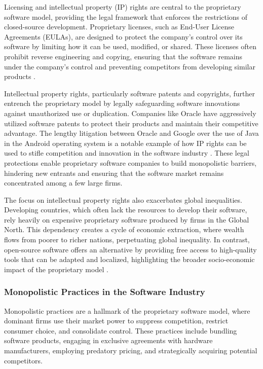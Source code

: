 \begin{refsection}
Licensing and intellectual property (IP) rights are central to the proprietary software model, providing the legal framework that enforces the restrictions of closed-source development. Proprietary licenses, such as End-User License Agreements (EULAs), are designed to protect the company’s control over its software by limiting how it can be used, modified, or shared. These licenses often prohibit reverse engineering and copying, ensuring that the software remains under the company’s control and preventing competitors from developing similar products \cite[pp.~85-90]{stallman2010}.

Intellectual property rights, particularly software patents and copyrights, further entrench the proprietary model by legally safeguarding software innovations against unauthorized use or duplication. Companies like Oracle have aggressively utilized software patents to protect their products and maintain their competitive advantage. The lengthy litigation between Oracle and Google over the use of Java in the Android operating system is a notable example of how IP rights can be used to stifle competition and innovation in the software industry \cite[pp.~58-65]{perens2005}. These legal protections enable proprietary software companies to build monopolistic barriers, hindering new entrants and ensuring that the software market remains concentrated among a few large firms.

The focus on intellectual property rights also exacerbates global inequalities. Developing countries, which often lack the resources to develop their software, rely heavily on expensive proprietary software produced by firms in the Global North. This dependency creates a cycle of economic extraction, where wealth flows from poorer to richer nations, perpetuating global inequality. In contrast, open-source software offers an alternative by providing free access to high-quality tools that can be adapted and localized, highlighting the broader socio-economic impact of the proprietary model \cite[pp.~31-37]{benkler2010}.

\subsubsection{Monopolistic Practices in the Software Industry}

Monopolistic practices are a hallmark of the proprietary software model, where dominant firms use their market power to suppress competition, restrict consumer choice, and consolidate control. These practices include bundling software products, engaging in exclusive agreements with hardware manufacturers, employing predatory pricing, and strategically acquiring potential competitors.


\end{refsection}
